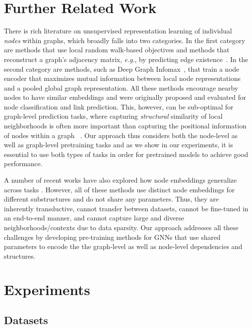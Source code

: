 \documentclass{article} \usepackage{iclr2020_conference,times}
\numberwithin{equation}{section}
\theoremstyle{plain}
\theoremstyle{definition}
\theoremstyle{remark}
\newcommand{\eg}{\textit{e.g.}}
\begin{document}
 \section{Further Related Work}
\vspace{-0.1cm}

There is rich literature on unsupervised representation learning of individual \emph{nodes} within graphs, which broadly falls into two categories. In the first category are methods that use local random walk-based objectives \citep{grover2016node2vec,perozzi2014deepwalk,tang2015line} and methods that reconstruct a graph's adjacency matrix, \eg, by predicting edge existence~\citep{hamilton2017inductive,kipf2016variational}.
In the second category are methods, such as Deep Graph Infomax~\citep{velivckovic2018deep}, that train a node encoder that maximizes mutual information between local node representations and a pooled global graph representation. All these methods encourage nearby nodes to have similar embeddings and were originally proposed and evaluated for node classification and link prediction. This, however, can be sub-optimal for graph-level prediction tasks, where capturing \emph{structural} similarity of local neighborhoods is often more important than capturing the positional information of nodes within a graph ~\citep{you2019position,ecfp2010,Yang2014egonet}.
Our approach thus considers both the node-level as well as graph-level pretraining tasks and as we show in our experiments, it is essential to use both types of tasks in order for pretrained models to achieve good performance.

A number of recent works have also explored how node embeddings generalize across tasks \citep{jaeger2018mol2vec,zhou2018learning,chakravarti2018distributed,narayanan2016subgraph2vec}.
However, all of these methods use distinct node embeddings for different substructures and do not share any parameters. Thus, they are inherently transductive, cannot transfer between datasets, cannot be fine-tuned in an end-to-end manner, and cannot capture large and diverse neighborhoods/contexts due to data sparsity. 
Our approach addresses all these challenges by developing pre-training methods for GNNs that use shared parameters to encode the the graph-level as well as node-level dependencies and structures.
 \section{Experiments}
\label{sec:experiments}

\subsection{Datasets}
\label{subsec:dataset}
\end{document}
